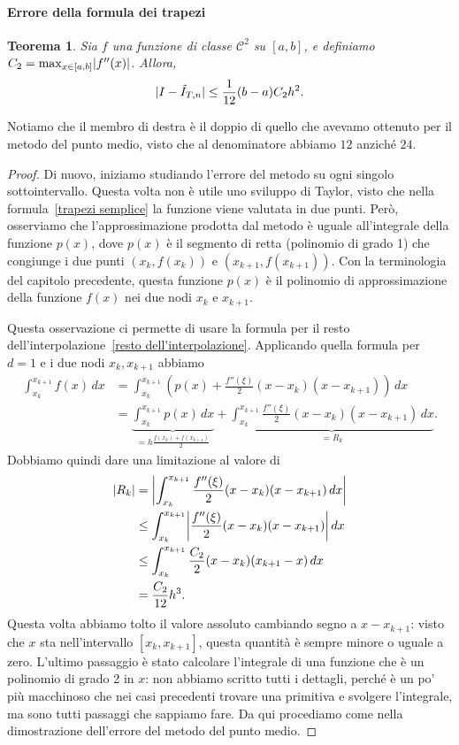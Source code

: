 \documentclass[a4paper]{report}
\DeclarePairedDelimiter{\abs}{\lvert}{\rvert}
\newtheorem{theorem}{Teorema}[chapter]
\theoremstyle{definiton}
\theoremstyle{remark}
\begin{document}
\paragraph{Errore della formula dei trapezi} 
\begin{theorem}
    Sia $f$ una funzione di classe $\mathcal{C}^2$ su $[a,b]$, e definiamo $C_2 = \max_{x\in [a,b]} \abs{f''(x)}$. Allora,
    \begin{equation} \label{trapezoid formula error}
        \abs{I - \tilde{I}_{T,n}} \leq \frac{1}{12} (b-a) C_2 h^2.
    \end{equation}
\end{theorem}
Notiamo che il membro di destra è il doppio di quello che avevamo ottenuto per il metodo del punto medio, visto che al denominatore abbiamo $12$ anziché $24$.
\begin{proof}
    Di nuovo, iniziamo studiando l'errore del metodo su ogni singolo sottointervallo. Questa volta non è utile uno sviluppo di Taylor, visto che nella formula~\eqref{trapezi semplice} la funzione viene valutata in due punti. Però, osserviamo che l'approssimazione prodotta dal metodo è uguale all'integrale della funzione $p(x)$, dove $p(x)$ è il segmento di retta (polinomio di grado 1) che congiunge i due punti $(x_k, f(x_k))$ e $(x_{k+1},f(x_{k+1}))$. Con la terminologia del capitolo precedente, questa funzione $p(x)$ è il polinomio di approssimazione della funzione $f(x)$ nei due nodi $x_k$ e $x_{k+1}$. 
    
    Questa osservazione ci permette di usare la formula per il resto dell'interpolazione~\eqref{resto dell'interpolazione}. Applicando quella formula per $d=1$ e i due nodi $x_k,x_{k+1}$ abbiamo
    \begin{align*}
    \int_{x_k}^{x_{k+1}} f(x)\, dx &= \int_{x_k}^{x_{k+1}} \left(p(x) + \frac{f''(\xi)}{2}(x-x_k)(x-x_{k+1}) \right)\, dx\\
    &= \underbrace{\int_{x_k}^{x_{k+1}} p(x)\, dx}_{=h\frac{f(x_k)+f(x_{k+1})}{2}} +
    \underbrace{\int_{x_k}^{x_{k+1}} \frac{f''(\xi)}{2}(x-x_k)(x-x_{k+1}) \, dx}_{=R_k}.
    \end{align*}
    Dobbiamo quindi dare una limitazione al valore di
    \begin{align*}
        \abs{R_k} &= \abs*{\int_{x_k}^{x_{k+1}} \frac{f''(\xi)}{2}(x-x_k)(x-x_{k+1}) \, dx}\\
        & \leq \int_{x_k}^{x_{k+1}} \abs*{\frac{f''(\xi)}{2}(x-x_k)(x-x_{k+1})}\, dx\\
        & \leq \int_{x_k}^{x_{k+1}} \frac{C_2}{2} (x-x_k)(x_{k+1}-x)\, dx\\
        & = \frac{C_2}{12}h^3.
    \end{align*}
    Questa volta abbiamo tolto il valore assoluto cambiando segno a $x - x_{k+1}$: visto che $x$ sta nell'intervallo $[x_k,x_{k+1}]$, questa quantità è sempre minore o uguale a zero. L'ultimo passaggio è stato calcolare l'integrale di una funzione che è un polinomio di grado 2 in $x$: non abbiamo scritto tutti i dettagli, perché è un po' più macchinoso che nei casi precedenti trovare una primitiva e svolgere l'integrale, ma sono tutti passaggi che sappiamo fare. Da qui procediamo come nella dimostrazione dell'errore del metodo del punto medio.
\end{proof}
\end{document}
